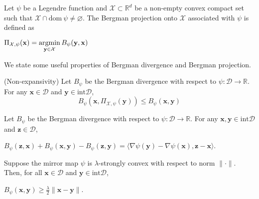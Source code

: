 \documentclass[12pt, a4paper]{report}
\begin{document}
\begin{defn}
Let $\psi$ be a Legendre function and $\mathcal{X} \subset \mathbb{R}^d$ be a non-empty convex compact set such that $\mathcal{X} \cap \mathrm{dom}\ \psi \neq \varnothing$. The Bergman projection onto $\mathcal{X}$ associated with $\psi$ is defined as 
\begin{center}
    $\displaystyle \Pi_{\mathcal{X}, \psi}(\mathbf{x}) = \operatorname*{argmin}_{\mathbf{y} \in \mathcal{X}} B_\psi(\mathbf{y}, \mathbf{x})$
\end{center}
\end{defn}
We state some useful properties of Bergman divergence and Bergman projection.
\begin{prop} (Non-expansivity) \label{prop:non-expansivity}
Let $B_\psi$ be the Bergman divergence with respect to $\psi : \mathcal{D} \rightarrow \mathbb{R}$. For any $\mathbf{x} \in \mathcal{D}$ and $\mathbf{y} \in \mathrm{int} \mathcal{D}$,
\begin{equation*}
    B_\psi(\mathbf{x}, \Pi_{\mathcal{X}, \psi}(\mathbf{y})) \leq B_\psi(\mathbf{x}, \mathbf{y})
\end{equation*}
\end{prop}
\begin{prop} \label{prop:jacobi-bergman}
Let $B_{\psi}$ be the Bergman divergence with respect to $\psi : \mathcal{D} \rightarrow \mathbb{R}$. For any $\mathbf{x}, \mathbf{y} \in \mathrm{int} \mathcal{D}$ and $\mathbf{z} \in \mathcal{D}$, 
\begin{center}
$B_{\psi}(\mathbf{z}, \mathbf{x}) + B_{\psi}(\mathbf{x}, \mathbf{y}) - B_{\psi}(\mathbf{z}, \mathbf{y}) = \langle \nabla \psi(\mathbf{y}) - \nabla \psi(\mathbf{x}), \mathbf{z} - \mathbf{x} \rangle$.
\end{center}
\end{prop}
\begin{prop} \label{prop:bergman-strong-convex}
Suppose the mirror map $\psi$ is $\lambda$-strongly convex with respect to norm $\lVert \cdot \rVert$. Then, for all $\mathbf{x} \in \mathcal{D}$ and $\mathbf{y} \in \mathrm{int} \mathcal{D}$, 
\begin{center}
    $\displaystyle B_\psi(\mathbf{x}, \mathbf{y}) \geq \frac{\lambda}{2}\lVert \mathbf{x} - \mathbf{y} \rVert$.
\end{center}
\end{prop}
\end{document}
